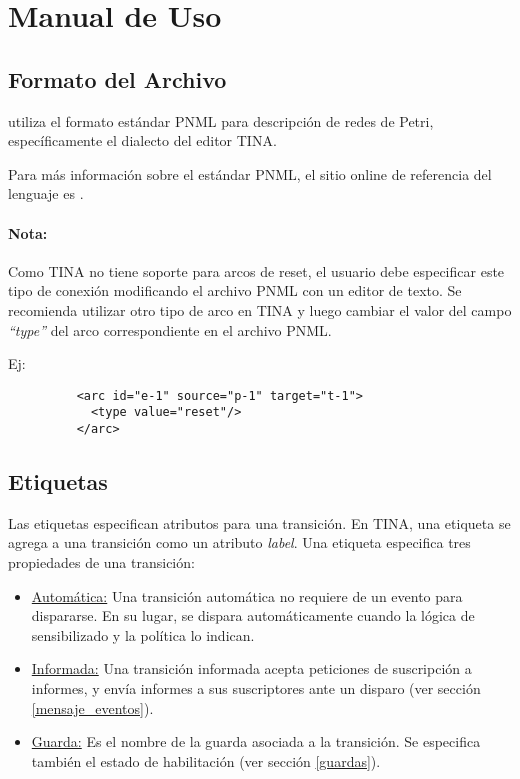 \section{Manual de Uso}

\subsection{Formato del Archivo}

\javapetriconcurrencymonitor utiliza el formato estándar PNML para descripción
de redes de Petri, específicamente el dialecto del editor TINA\cite{TinaSite}.

Para más información sobre el estándar PNML, el sitio online de referencia del
lenguaje es \cite{PnmlSite}.

\begin{framed}
    \paragraph{Nota:}
    Como TINA no tiene soporte para arcos de reset, el usuario debe especificar
    este tipo de conexión modificando el archivo PNML con un editor de texto.
    Se recomienda utilizar otro tipo de arco en TINA y luego cambiar el valor del
    campo \textit{``type''} del arco correspondiente en el archivo PNML.
    
    Ej:
    \begin{figure}[H]
    \centering
    \begin{verbatim}
    <arc id="e-1" source="p-1" target="t-1">
      <type value="reset"/>
    </arc>
    \end{verbatim}
    \end{figure}
\end{framed}

\subsection{Etiquetas}

Las etiquetas especifican atributos para una transición. En TINA, una etiqueta
se agrega a una transición como un atributo \textit{label}.
Una etiqueta especifica tres propiedades de una transición:

\begin{itemize}
    \item \underline{Automática:} Una transición automática no requiere de un
    evento para dispararse. En su lugar, se dispara automáticamente cuando la
    lógica de sensibilizado y la política lo indican.
    \item \underline{Informada:} Una transición informada acepta peticiones de
    suscripción a informes, y envía informes a sus suscriptores ante un disparo
    (ver sección \ref{mensaje_eventos}).
    \item \underline{Guarda:} Es el nombre de la guarda asociada a la
    transición. Se especifica también el estado de habilitación (ver sección
    \ref{guardas}).
\end{itemize}

